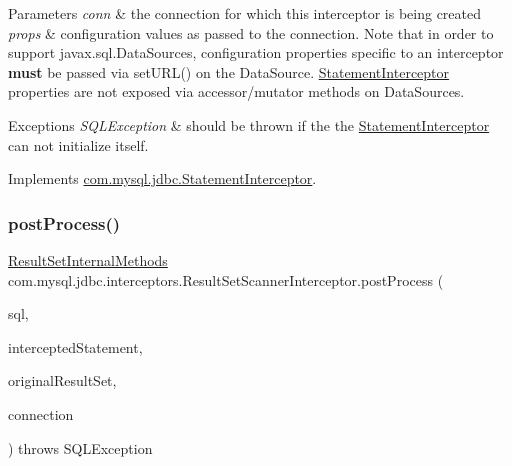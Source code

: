 \begin{DoxyParams}{Parameters}
{\em conn} & the connection for which this interceptor is being created \\
\hline
{\em props} & configuration values as passed to the connection. Note that in order to support javax.\+sql.\+Data\+Sources, configuration properties specific to an interceptor {\bfseries must} be passed via set\+U\+R\+L() on the Data\+Source. \mbox{\hyperlink{interfacecom_1_1mysql_1_1jdbc_1_1_statement_interceptor}{Statement\+Interceptor}} properties are not exposed via accessor/mutator methods on Data\+Sources.\\
\hline
\end{DoxyParams}

\begin{DoxyExceptions}{Exceptions}
{\em S\+Q\+L\+Exception} & should be thrown if the the \mbox{\hyperlink{interfacecom_1_1mysql_1_1jdbc_1_1_statement_interceptor}{Statement\+Interceptor}} can not initialize itself. \\
\hline
\end{DoxyExceptions}


Implements \mbox{\hyperlink{interfacecom_1_1mysql_1_1jdbc_1_1_statement_interceptor_a985c3d5d0c9b9694cfb73ba92273409e}{com.\+mysql.\+jdbc.\+Statement\+Interceptor}}.

\mbox{\label{classcom_1_1mysql_1_1jdbc_1_1interceptors_1_1_result_set_scanner_interceptor_af1b03296ceed6761576b649084580067}} 
\subsubsection{\texorpdfstring{post\+Process()}{postProcess()}}
{\footnotesize\ttfamily \mbox{\hyperlink{interfacecom_1_1mysql_1_1jdbc_1_1_result_set_internal_methods}{Result\+Set\+Internal\+Methods}} com.\+mysql.\+jdbc.\+interceptors.\+Result\+Set\+Scanner\+Interceptor.\+post\+Process (\begin{DoxyParamCaption}\item[{String}]{sql,  }\item[{\mbox{\hyperlink{interfacecom_1_1mysql_1_1jdbc_1_1_statement}{Statement}}}]{intercepted\+Statement,  }\item[{\mbox{\hyperlink{interfacecom_1_1mysql_1_1jdbc_1_1_result_set_internal_methods}{Result\+Set\+Internal\+Methods}}}]{original\+Result\+Set,  }\item[{\mbox{\hyperlink{interfacecom_1_1mysql_1_1jdbc_1_1_connection}{Connection}}}]{connection }\end{DoxyParamCaption}) throws S\+Q\+L\+Exception}

